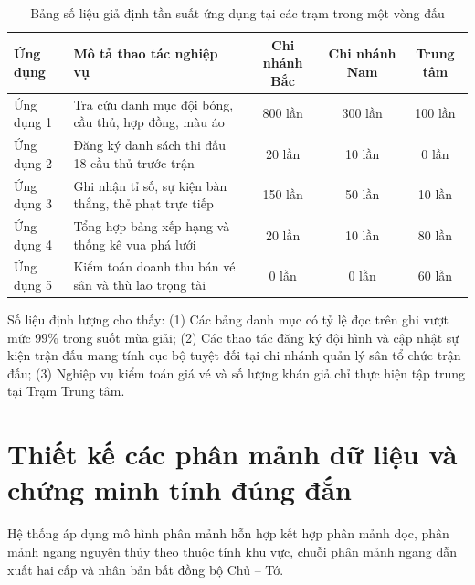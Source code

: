 \begin{table}[H]
\centering
\small
\begin{tabular}{|l|p{6.5cm}|c|c|c|}
\hline
\textbf{Ứng dụng} & \textbf{Mô tả thao tác nghiệp vụ} & \textbf{Chi nhánh Bắc} & \textbf{Chi nhánh Nam} & \textbf{Trung tâm} \\ \hline
Ứng dụng 1 & Tra cứu danh mục đội bóng, cầu thủ, hợp đồng, màu áo & 800 lần & 300 lần & 100 lần \\ \hline
Ứng dụng 2 & Đăng ký danh sách thi đấu 18 cầu thủ trước trận & 20 lần & 10 lần & 0 lần \\ \hline
Ứng dụng 3 & Ghi nhận tỉ số, sự kiện bàn thắng, thẻ phạt trực tiếp & 150 lần & 50 lần & 10 lần \\ \hline
Ứng dụng 4 & Tổng hợp bảng xếp hạng và thống kê vua phá lưới & 20 lần & 10 lần & 80 lần \\ \hline
Ứng dụng 5 & Kiểm toán doanh thu bán vé sân và thù lao trọng tài & 0 lần & 0 lần & 60 lần \\ \hline
\end{tabular}
\caption{Bảng số liệu giả định tần suất ứng dụng tại các trạm trong một vòng đấu}
\label{tab:tan_suat_ung_dung}
\end{table}

Số liệu định lượng cho thấy: (1) Các bảng danh mục có tỷ lệ đọc trên ghi vượt mức $99\%$ trong suốt mùa giải; (2) Các thao tác đăng ký đội hình và cập nhật sự kiện trận đấu mang tính cục bộ tuyệt đối tại chi nhánh quản lý sân tổ chức trận đấu; (3) Nghiệp vụ kiểm toán giá vé và số lượng khán giả chỉ thực hiện tập trung tại Trạm Trung tâm.

\section{Thiết kế các phân mảnh dữ liệu và chứng minh tính đúng đắn}

Hệ thống áp dụng mô hình phân mảnh hỗn hợp kết hợp phân mảnh dọc, phân mảnh ngang nguyên thủy theo thuộc tính khu vực, chuỗi phân mảnh ngang dẫn xuất hai cấp và nhân bản bất đồng bộ Chủ -- Tớ.

